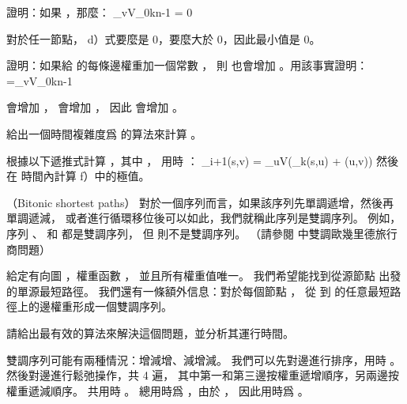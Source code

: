 \startigBase[continue]\startitem
證明：如果 ，那麼：
\startformula
\min_{v\in V}\max_{0\le k\le n-1}  = 0
\stopformula
\stopitem\stopigBase

\startANSWER
對於任一節點， d）式要麼是 0，要麼大於 0，因此最小值是 0。
\stopANSWER

\startigBase[continue]\startitem
證明：如果給  的每條邊權重加一個常數 ，
則 \m{\mu*} 也會增加 。用該事實證明：
\startformula
\mu*=\min_{v\in V}\max_{0\le k\le n-1} 
\stopformula
\stopitem\stopigBase

\startANSWER
{} 會增加 ，  會增加 ，
因此  會增加 。
\stopANSWER

\startigBase[continue]\startitem
給出一個時間複雜度爲  的算法來計算 \m{\mu*}。
\stopitem\stopigBase

\startANSWER
根據以下遞推式計算 ，其中 ，
用時 ：
\startformula
\delta_{i+1}(s,v) = \min_{u\in V}(\delta_k(s,u) + \omega(u,v))
\stopformula
然後在  時間內計算 f）中的極值。
\stopANSWER

\stopPROBLEM

\startPROBLEM
（Bitonic shortest paths）
對於一個序列而言，如果該序列先單調遞增，然後再單調遞減，
或者進行循環移位後可以如此，我們就稱此序列是{\EMP 雙調序列}。
例如，序列 、
  和  都是雙調序列，
但  則不是雙調序列。
（請參閱 中雙調歐幾里德旅行商問題）

給定有向圖 ，權重函數 ，
並且所有權重值唯一。
我們希望能找到從源節點  出發的單源最短路徑。
我們還有一條額外信息：對於每個節點 ，
從  到  的任意最短路徑上的邊權重形成一個雙調序列。

請給出最有效的算法來解決這個問題，並分析其運行時間。
\stopPROBLEM

\startANSWER
雙調序列可能有兩種情況：增減增、減增減。
我們可以先對邊進行排序，用時 。
然後對邊進行鬆弛操作，共 4 遍，
其中第一和第三邊按權重遞增順序，另兩邊按權重遞減順序。
共用時 。
總用時爲 ，由於 ，
因此用時爲 。
\stopANSWER

\stopsubject%
